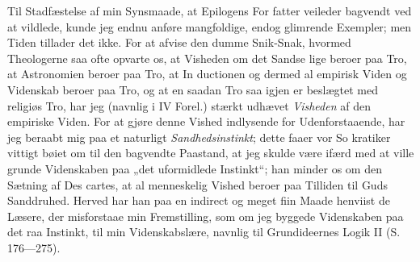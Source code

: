 \documentclass[12pt]{book}
\begin{document}
Til Stadfæstelse af min Synsmaade, at Epilogens For\-%
fatter veileder bagvendt ved at vildlede, kunde jeg endnu anføre
mangfoldige, endog glimrende Exempler; men Tiden tillader
det ikke. For at afvise den dumme Snik-Snak, hvormed
Theologerne saa ofte opvarte os, at Visheden om det Sandse\-%
lige beroer paa Tro, at Astronomien beroer paa Tro, at In\-%
ductionen og dermed al empirisk Viden og Videnskab beroer
paa Tro, og at en saadan Tro saa igjen er beslægtet med
religiøs Tro, har jeg (navnlig i IV Forel.) stærkt udhævet
\emph{Visheden} af den empiriske Viden. For at gjøre denne
Vished indlysende for Udenforstaaende, har jeg beraabt mig
paa et naturligt \emph{Sandhedsinstinkt}; dette faaer vor So\-%
kratiker vittigt bøiet om til den bagvendte Paastand, at jeg
skulde være ifærd med at ville grunde Videnskaben paa „det
uformidlede Instinkt“; han minder os om den Sætning af Des\-%
cartes, at al menneskelig Vished beroer paa Tilliden til Guds
Sanddruhed. Herved har han paa en indirect og meget fiin
Maade henviist de Læsere, der misforstaae min Fremstilling,
som om jeg byggede Videnskaben paa det raa Instinkt, til
min Videnskabslære, navnlig til Grundideernes Logik II (S.
176---275).
\end{document}
